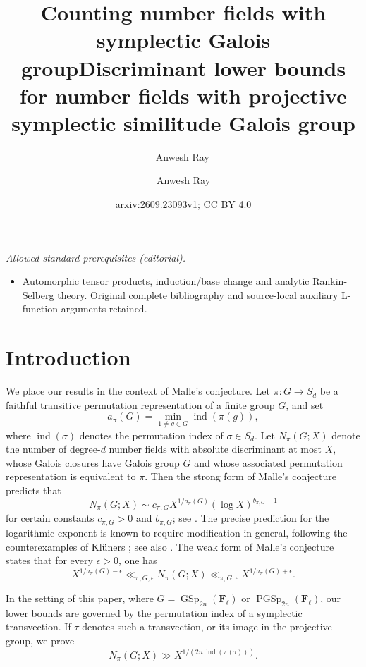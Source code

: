 \documentclass[11pt,hidelinks]{amsart}
\title[Counting symplectic Galois number fields]{Counting number fields with symplectic Galois group}
\author[A.~Ray]{Anwesh Ray\, \orcidlink{0000-0001-6946-1559}}
\title{Discriminant lower bounds for number fields with projective symplectic similitude Galois group}
\author{Anwesh Ray}
\date{arxiv:2609.23093v1; CC BY 4.0}
\newcommand{\F}{\mathbf F}
\newcommand{\GSp}{\operatorname{GSp}}
\newcommand{\PGSp}{\operatorname{PGSp}}
\begin{document}
\maketitle
\noindent\textit{Allowed standard prerequisites (editorial).}\begin{itemize}
\item Automorphic tensor products, induction/base change and analytic Rankin-Selberg theory. Original complete bibliography and source-local auxiliary L-function arguments retained.
\end{itemize}\medskip
\section{Introduction}\label{sec:introduction}
We place our results in the context of Malle's conjecture. Let
$\pi:G\rightarrow S_d$ be a faithful transitive permutation
representation of a finite group $G$, and set
\[
a_\pi(G)
=
\min_{1\neq g\in G}\operatorname{ind}(\pi(g)),
\]
where $\operatorname{ind}(\sigma)$ denotes the permutation index of
$\sigma\in S_d$. Let $N_\pi(G;X)$ denote the number of degree-$d$
number fields with absolute discriminant at most $X$, whose Galois
closures have Galois group $G$ and whose associated permutation
representation is equivalent to $\pi$. Then the strong form of
Malle's conjecture predicts that
\[N_\pi(G;X)\sim c_{\pi,G}X^{1/a_\pi(G)}
(\log X)^{b_{\pi,G}-1}\]
for certain constants $c_{\pi,G}>0$ and $b_{\pi,G}$; see \cite{Malle2002,Malle2004}. The precise
prediction for the logarithmic exponent is known to require
modification in general, following the counterexamples of Kl\"uners
\cite{Kluners2005}; see also \cite{Turkelli2015}. The weak form of Malle's conjecture states that for every $\epsilon>0$, one has
\[
X^{1/a_\pi(G)-\epsilon}
\ll_{\pi,G,\epsilon}
N_\pi(G;X)
\ll_{\pi,G,\epsilon}
X^{1/a_\pi(G)+\epsilon}.
\]

In the setting of this paper, where
$G=\GSp_{2n}(\F_\ell)$ or $\PGSp_{2n}(\F_\ell)$, our lower bounds are
governed by the permutation index of a symplectic transvection.  If
$\tau$ denotes such a transvection, or its image in the projective
group, we prove
\[
N_\pi(G;X)
\gg
X^{1/(2n\,\operatorname{ind}(\pi(\tau)))}.
\]
\end{document}
